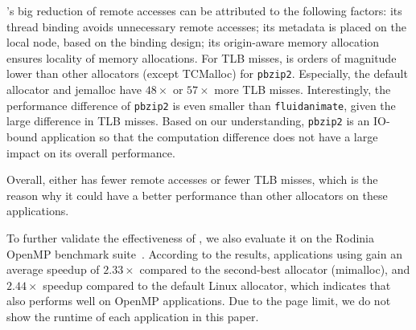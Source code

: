 \NM{}'s big reduction of remote accesses can be attributed to the following factors: its thread binding avoids unnecessary remote accesses; its metadata is placed on the local node, based on the binding design; its origin-aware memory allocation ensures locality of memory allocations.
For TLB misses, \NM{} is orders of magnitude lower than other allocators (except TCMalloc) for \texttt{pbzip2}. Especially, the default allocator and jemalloc have $48\times$ or $57\times$ more TLB misses. Interestingly, the performance difference of \texttt{pbzip2} is even smaller than \texttt{fluidanimate}, given the large difference in TLB misses. Based on our understanding, \texttt{pbzip2} is an IO-bound application so that the computation difference does not have a large impact on its overall performance. 

Overall, \NM{} either has fewer remote accesses or fewer TLB misses, which is the reason why it could have a better performance than other allocators on these applications. 

To further validate the effectiveness of \NM{}, we also evaluate it on the Rodinia OpenMP benchmark suite~\cite{che2009rodinia}. According to the results, applications using \NM{} gain an average speedup of $2.33\times$ compared to the second-best allocator (mimalloc), and $2.44\times$ speedup compared to the default Linux allocator, which indicates that \NM{} also performs well on OpenMP applications. Due to the page limit, we do not show the runtime of each application in this paper. 







